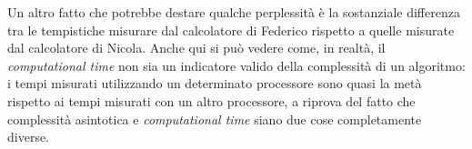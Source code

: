 Un altro fatto che potrebbe destare qualche perplessità è la sostanziale differenza tra le tempistiche misurare dal calcolatore di Federico rispetto a quelle misurate dal calcolatore di Nicola. Anche qui si può vedere come, in realtà, il \emph{computational time} non sia un indicatore valido della complessità di un algoritmo: i tempi misurati utilizzando un determinato processore sono quasi la metà rispetto ai tempi misurati con un altro processore, a riprova del fatto che complessità asintotica e \emph{computational time} siano due cose completamente diverse.

